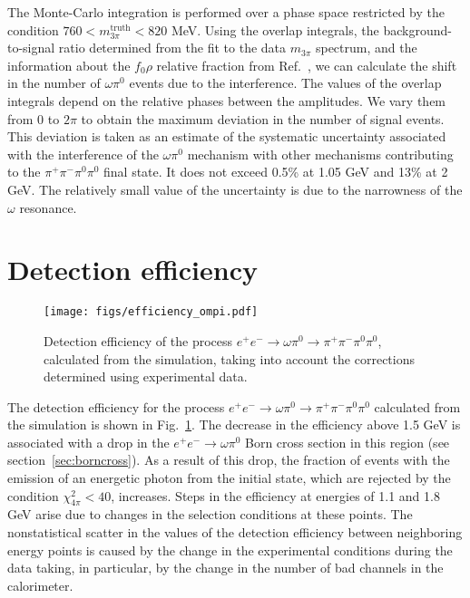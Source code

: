 \documentclass[twocolumn,aps,prd,floatfix,nofootinbib,superscriptaddress]{revtex4-2}
\begin{document}
The Monte-Carlo integration is performed over a phase space restricted by the condition \( 760 < m_{3\pi}^\text{truth} < 820 \) MeV.
Using the overlap integrals, the background-to-signal ratio determined from the fit to the data $m_{3\pi}$ spectrum, and the information about the $f_0\rho$ relative fraction from Ref.~\cite{babar17}, we can calculate the shift in the number of $\omega\pi^0$ events due to the interference.
The values of the overlap integrals depend on the relative phases between the amplitudes.
We vary them from 0 to $2\pi$ to obtain the maximum deviation in the number of signal events.
This deviation is taken as an estimate of the systematic uncertainty associated with the interference of the $\omega\pi^0$ mechanism with other mechanisms contributing to the $\pi^+\pi^-\pi^0\pi^0$ final state.
It does not exceed 0.5\% at 1.05 GeV and 13\% at 2 GeV.
The relatively small value of the uncertainty is due to the narrowness of the $\omega$ resonance.

\section{Detection efficiency}
\label{sec:effcorr}

\begin{figure}
\centering
\texttt{[image: figs/efficiency\_ompi.pdf]}
\caption{
	Detection efficiency of the process \( e^+ e^- \to \omega\pi^0 \to \pi^+ \pi^-\pi^0\pi^0 \), calculated from the simulation, taking into account the corrections determined using experimental data.
}
\label{fig:efficiency}
\end{figure}

The detection efficiency for the process \( e^+ e^- \to \omega\pi^0 \to \pi^+ \pi^-\pi^0 \pi^0 \) calculated from the simulation is shown in Fig.~\ref{fig:efficiency}.
The decrease in the efficiency above 1.5 GeV is associated with a drop in the \( e^+e^- \to \omega\pi^0 \) Born cross section in this region (see section~\ref{sec:borncross}).
As a result of this drop, the fraction of events with the emission of an energetic photon from the initial state, which are rejected by the condition $\chi^2_{4\pi} < 40$, increases.
Steps in the efficiency at energies of 1.1 and 1.8 GeV arise due to changes in the selection conditions at these points.
The nonstatistical scatter in the values of the detection efficiency between neighboring energy points is caused by the change in the experimental conditions during the data taking, in particular, by the change in the number of bad channels in the calorimeter.
\end{document}
